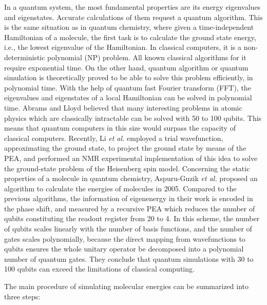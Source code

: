 \documentclass[8.5pt,twoside,twocolumn]{article}
\begin{document}
In a quantum system,
the most fundamental properties are its
energy eigenvalues and eigenstates.
Accurate calculations of them request a quantum algorithm.
This is the same situation as in quantum chemistry,
where given a time-independent Hamiltonian of a molecule,
the first task is to calculate the ground state energy, i.e.,
the lowest eigenvalue of the Hamiltonian.
In classical computers, it is a non-deterministic polynomial (NP) problem.
All known classical algorithms for it require exponential time.
On the other hand, quantum algorithm or quantum simulation
is theoretically proved to be able to solve this problem efficiently,
in polynomial time.\cite{PEA_1}
With the help of quantum fast Fourier transform (FFT),
the eigenvalues and eigenstates of a local Hamiltonian
can be solved in polynomial time.
Abrams and Lloyd\cite{PEA_1} believed that many interesting problems
in atomic physics which are classically intractable
can be solved with 50 to 100 qubits.
This means that quantum computers in this size
would surpass the capacity of classical computers.
Recently, Li \emph{et al.}\cite{Li}
employed a trial wavefunction, approximating the ground state,
to project the ground state by means of the PEA,
and performed an NMR experimental implementation of this idea
to solve the ground-state problem
of the Heisenberg spin model.
Concerning the static properties of a molecule in quantum chemistry,
Aspuru-Guzik \emph{et al.}\cite{Alan_first} proposed an algorithm
to calculate the energies of molecules in 2005.
Compared to the previous algorithms,
the information of eigenenergy in their work
is encoded in the phase shift,
and measured by a recursive PEA which
reduces the number of qubits constituting the readout register
from 20 to 4.
In this scheme, the number of qubits scales linearly
with the number of basis functions,
and the number of gates scales polynomially,
because the direct mapping from wavefunctions to qubits
ensures the whole unitary operator
be decomposed into a polynomial number of quantum gates.
They conclude\cite{Alan_first} that quantum simulations
with 30 to 100 qubits can exceed the limitations
of classical computing. %


The main procedure of simulating molecular energies can be summarized into three steps:
\end{document}
